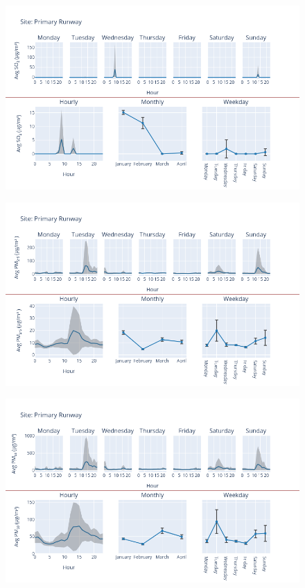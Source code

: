 \documentclass[12pt, oneside]{book}
\begin{document}
{ 
{\begin{figure}[H] 
 \centering 
\includegraphics[width=.88\textwidth, keepaspectratio]{image101} 
 \end{figure}}{} 

{\begin{figure}[H] 
 \centering 
\includegraphics[width=.88\textwidth, keepaspectratio]{image102} 
 \end{figure}}{} 

{\begin{figure}[H] 
 \centering 
\includegraphics[width=.88\textwidth, keepaspectratio]{image103} 
 \end{figure}}{} 

}
\end{document}
